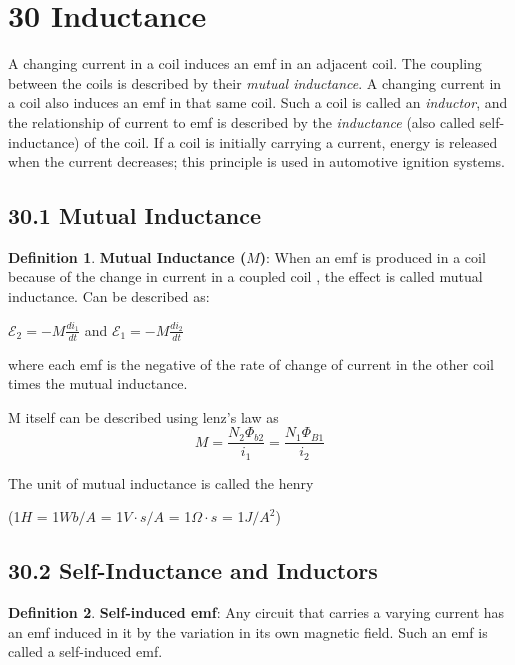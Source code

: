 \documentclass[12pt]{amsart}
\theoremstyle{definition}
\newtheorem{definition}{Definition} %
\numberwithin{equation}{theorem}    %
\begin{document}
\section*{30 Inductance}
A changing current in a coil induces an emf in an adjacent coil. The coupling between the coils is described by their \textit{mutual inductance}. A changing current in a coil also induces an emf in that same coil. Such a coil is called an \textit{inductor}, and the relationship of current to emf is described by the \textit{inductance} (also called self- inductance) of the coil. If a coil is initially carrying a current, energy is released when the current decreases; this principle is used in automotive ignition systems.

\subsection*{30.1 Mutual Inductance}

\begin{definition}
    \textbf{Mutual Inductance ($M$)}:
    When an emf is produced in a coil because of the change in current in a coupled coil , the effect is called mutual inductance. Can be described as:
    \begin{center}
        $\mathcal{E}_2 = -M\frac{di_1}{dt}$ and $\mathcal{E}_1 = -M\frac{di_2}{dt}$ 
    \end{center}
    where each emf is the negative of the rate of change of current in the other coil times the mutual inductance. 

    M itself can be described using lenz's law as $$M = \frac{N_2 \Phi_{b2}}{i_1} = \frac{N_1\Phi_{B1}}{i_2}$$ 

    The unit of mutual inductance is called the henry 
    \begin{center}
        (1$H$ = 1$Wb/A$ = 1$V\cdot s/A$ = 1$\Omega \cdot s$ = 1$J/A^2$)
    \end{center}
    
\end{definition}

\subsection*{30.2 Self-Inductance and Inductors}

\begin{definition}
    \textbf{Self-induced emf}:
    Any circuit that carries a varying current has an emf induced in it by the variation in its own magnetic field. Such an emf is called a self-induced emf.
\end{definition}
\end{document}
